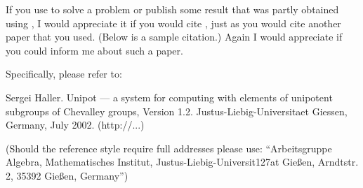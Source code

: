 
If you  use {\Unipot} to solve a problem or publish some  result
that was partly obtained  using {\Unipot}, I would appreciate it
if you would  cite {\Unipot},  just  as you  would  cite another
paper that you used. (Below is a sample citation.) Again I would
appreciate if you could inform me about such a paper.

Specifically, please refer to:
 
\begintt
[Hal02] Sergei Haller. Unipot --- a system for computing with elements
        of unipotent subgroups of Chevalley groups, Version 1.2.
        Justus-Liebig-Universitaet Giessen, Germany, July 2002. 
        (http://...)
\endtt
 
(Should the reference style require full addresses please use:
``Arbeitsgruppe Algebra,
  Mathematisches Institut,
  Justus-Liebig-Universit{\accent127a}t Gie{\ss}en,
  Arndtstr. 2,
  35392 Gie{\ss}en, Germany'')





